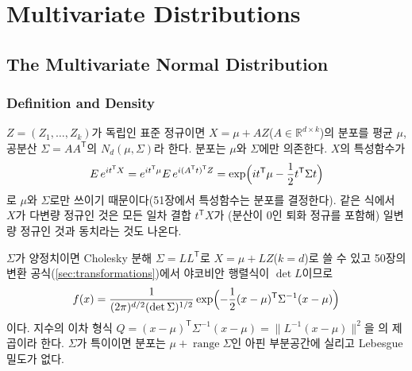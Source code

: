 \chapter{Multivariate Distributions}
\label{ch:multivariate-distributions}


\section{The Multivariate Normal Distribution}
\label{sec:mvn}

\subsection{Definition and Density}

$Z=(Z_1,\dots,Z_k)$가 독립인 표준 정규이면 $X=\mu+AZ$($A\in\mathbb R^{d\times k}$)의 분포를 평균 $\mu$, 공분산 $\Sigma=AA^{\mathsf T}$의  $N_d(\mu,\Sigma)$라 한다. 분포는 $\mu$와 $\Sigma$에만 의존한다. $X$의 특성함수가
\[
E\,e^{it^{\mathsf T}X}=e^{it^{\mathsf T}\mu}E\,e^{i(A^{\mathsf T}t)^{\mathsf T}Z}=\exp\Bigl(it^{\mathsf T}\mu-\frac12t^{\mathsf T}\Sigma t\Bigr)
\]
로 $\mu$와 $\Sigma$로만 쓰이기 때문이다(51장에서 특성함수는 분포를 결정한다). 같은 식에서 $X$가 다변량 정규인 것은 모든 일차 결합 $t^{\mathsf T}X$가 (분산이 $0$인 퇴화 정규를 포함해) 일변량 정규인 것과 동치라는 것도 나온다.

$\Sigma$가 양정치이면 Cholesky 분해 $\Sigma=LL^{\mathsf T}$로 $X=\mu+LZ$($k=d$)로 쓸 수 있고 50장의 변환 공식(\cref{sec:transformations})에서 야코비안 행렬식이 $\det L$이므로
\[
f(x)=\frac1{(2\pi)^{d/2}(\det\Sigma)^{1/2}}\exp\Bigl(-\frac12(x-\mu)^{\mathsf T}\Sigma^{-1}(x-\mu)\Bigr)
\]
이다. 지수의 이차 형식 $Q=(x-\mu)^{\mathsf T}\Sigma^{-1}(x-\mu)=\|L^{-1}(x-\mu)\|^2$을 의 제곱이라 한다. $\Sigma$가 특이이면 분포는 $\mu+\operatorname{range}\Sigma$인 아핀 부분공간에 실리고 Lebesgue 밀도가 없다.

